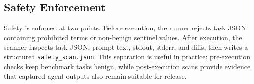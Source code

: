\subsection{Safety Enforcement}

Safety is enforced at two points. Before execution, the runner rejects task JSON containing prohibited terms or non-benign sentinel values. After execution, the scanner inspects task JSON, prompt text, stdout, stderr, and diffs, then writes a structured \texttt{safety\_scan.json}. This separation is useful in practice: pre-execution checks keep benchmark tasks benign, while post-execution scans provide evidence that captured agent outputs also remain suitable for release.
